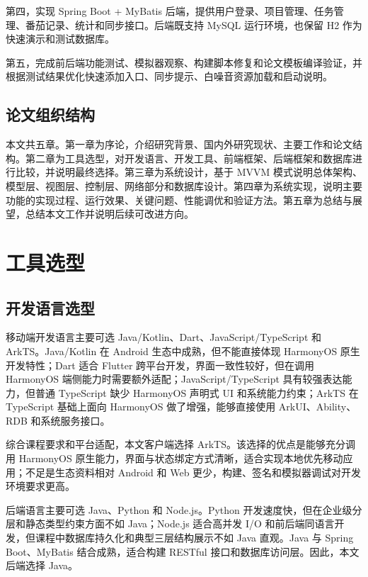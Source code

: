 第四，实现 Spring Boot + MyBatis 后端，提供用户登录、项目管理、任务管理、番茄记录、统计和同步接口。后端既支持 MySQL 运行环境，也保留 H2 作为快速演示和测试数据库。

第五，完成前后端功能测试、模拟器观察、构建脚本修复和论文模板编译验证，并根据测试结果优化快速添加入口、同步提示、白噪音资源加载和启动说明。

\section{论文组织结构}

本文共五章。第一章为序论，介绍研究背景、国内外研究现状、主要工作和论文结构。第二章为工具选型，对开发语言、开发工具、前端框架、后端框架和数据库进行比较，并说明最终选择。第三章为系统设计，基于 MVVM 模式说明总体架构、模型层、视图层、控制层、网络部分和数据库设计。第四章为系统实现，说明主要功能的实现过程、运行效果、关键问题、性能调优和验证方法。第五章为总结与展望，总结本文工作并说明后续可改进方向。

\chapter{工具选型}

\section{开发语言选型}

移动端开发语言主要可选 Java/Kotlin、Dart、JavaScript/TypeScript 和 ArkTS。Java/Kotlin 在 Android 生态中成熟，但不能直接体现 HarmonyOS 原生开发特性；Dart 适合 Flutter 跨平台开发，界面一致性较好，但在调用 HarmonyOS 端侧能力时需要额外适配；JavaScript/TypeScript 具有较强表达能力，但普通 TypeScript 缺少 HarmonyOS 声明式 UI 和系统能力约束；ArkTS 在 TypeScript 基础上面向 HarmonyOS 做了增强，能够直接使用 ArkUI、Ability、RDB 和系统服务接口。

综合课程要求和平台适配，本文客户端选择 ArkTS。该选择的优点是能够充分调用 HarmonyOS 原生能力，界面与状态绑定方式清晰，适合实现本地优先移动应用；不足是生态资料相对 Android 和 Web 更少，构建、签名和模拟器调试对开发环境要求更高。

后端语言主要可选 Java、Python 和 Node.js。Python 开发速度快，但在企业级分层和静态类型约束方面不如 Java；Node.js 适合高并发 I/O 和前后端同语言开发，但课程中数据库持久化和典型三层结构展示不如 Java 直观。Java 与 Spring Boot、MyBatis 结合成熟，适合构建 RESTful 接口和数据库访问层。因此，本文后端选择 Java。

